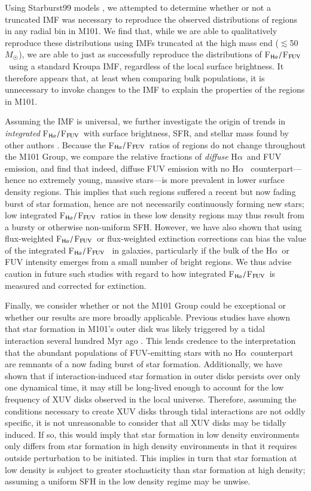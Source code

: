 \documentclass[iop]{emulateapj}
\newcommand{\ha}{H$\alpha$}
\newcommand{\hafuv}{F$_{\rm H\alpha}/$F$_{\rm FUV}$}
\begin{document}
Using Starburst99 models \citep{leitherer99}, we attempted to
determine whether or not a truncated IMF was necessary to reproduce
the observed distributions of  regions in any radial bin in
M101.  We find that, while we are able to qualitatively reproduce
these distributions using IMFs truncated at the high mass end
  ($\lesssim$50 $M_{\astrosun}$), we are able to just as successfully
reproduce the distributions of \hafuv \ using a standard Kroupa IMF,
regardless of the local surface brightness.  It therefore appears
that, at least when comparing bulk populations, it is unnecessary to
invoke changes to the IMF to explain the properties of the 
regions in M101.

Assuming the IMF is universal, we further investigate the origin of
trends in \emph{integrated} \hafuv \ with surface brightness, SFR, and
stellar mass found by other authors \citep[e.g.][]{thilker05,
  boselli09, lee09, meurer09, goddard10}.  Because the \hafuv \ ratios
of  regions do not change throughout the M101 Group, we
compare the relative fractions of \emph{diffuse} \ha \ and FUV
emission, and find that indeed, diffuse FUV emission with no \ha
\ counterpart---hence no extremely young, massive stars---is more
prevalent in lower surface density regions.  This implies that such
regions suffered a recent but now fading burst of star formation,
hence are not necessarily continuously forming new stars; low
integrated \hafuv \ ratios in these low density regions may thus
result from a bursty or otherwise non-uniform SFH.  However, we have
also shown that using flux-weighted \hafuv \ or flux-weighted
extinction corrections can bias the value of the integrated \hafuv
\ in galaxies, particularly if the bulk of the \ha \ or FUV intensity
emerges from a small number of bright  regions.  We thus
advise caution in future such studies with regard to how integrated
\hafuv \ is measured and corrected for extinction.

Finally, we consider whether or not the M101 Group could be
exceptional or whether our results are more broadly applicable.
Previous studies have shown that star formation in M101's outer disk
was likely triggered by a tidal interaction several hundred Myr ago
\citep{mihos13}.  This lends credence to the interpretation that the
abundant populations of FUV-emitting stars with no \ha \ counterpart
are remnants of a now fading burst of star formation.  Additionally,
we have shown that if interaction-induced star formation in outer
disks persists over only one dynamical time, it may still be
long-lived enough to account for the low frequency
\citep[4--14\%;][]{lemonias11} of XUV disks observed in the local
universe.  Therefore, assuming the conditions necessary to create XUV
disks through tidal interactions are not oddly specific, it is not
unreasonable to consider that all XUV disks may be tidally induced.
If so, this would imply that star formation in low density
environments only differs from star formation in high density
environments in that it requires outside perturbation to be initiated.
This implies in turn that star formation at low density is subject to
greater stochasticity than star formation at high density; assuming a
uniform SFH in the low density regime may be unwise.
\end{document}
